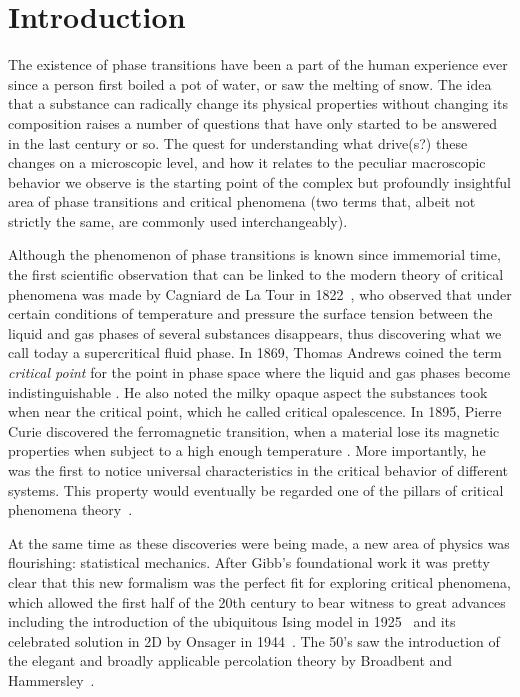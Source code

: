 \chapter{Introduction}
\label{ch1-intr}


The existence of phase transitions have been a part of the human experience ever
since a person first boiled a pot of water, or saw the melting of snow. The
idea that a substance can radically change its physical properties without
changing its composition raises a number of questions that have only started to
be answered in the last century or so. The quest for understanding what
drive(s?) these changes on a microscopic level, and how it relates to the
peculiar macroscopic behavior we observe is the starting point of the complex
but profoundly insightful area of phase transitions and critical phenomena (two
terms that, albeit not strictly the same, are commonly used interchangeably).

Although the phenomenon of phase transitions is known since immemorial time,
the first scientific observation that can be linked to the modern theory of
critical phenomena was made by Cagniard de La Tour in 1822~\cite{delaTour1822},
who observed that under certain conditions of temperature and pressure the
surface tension between the liquid and gas phases of several substances
disappears, thus discovering what we call today a supercritical fluid phase. In
1869, Thomas Andrews coined the term \textit{critical point} for the point in
phase space where the liquid and gas phases become indistinguishable
\cite{Andrews1869}. He also noted the milky opaque aspect the substances took
when near the critical point, which he called critical opalescence.
In 1895, Pierre Curie discovered the ferromagnetic transition, when a material
lose its magnetic properties when subject to a high enough temperature
\cite{Curie1895}. More importantly, he was the first to notice universal
characteristics in the critical behavior of different systems. This property
would eventually be regarded one of the pillars of critical phenomena
theory~\cite{Stanley1999}.

At the same time as these discoveries were being made, a new area of physics
was flourishing: statistical mechanics. After Gibb's foundational work
\cite{Gibbs1906} it was pretty clear that this new formalism was the perfect
fit for exploring critical phenomena, which allowed the first half of the 20th
century to bear witness to great advances including the introduction of the
ubiquitous Ising model in 1925~\cite{Ising1925} and its celebrated solution in
2D by Onsager in 1944~\cite{Onsager1944}. The 50's saw the introduction of the
elegant and broadly applicable percolation theory by Broadbent and
Hammersley~\cite{Broadbent1957}.

